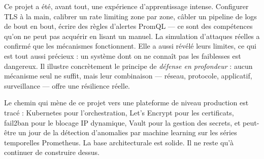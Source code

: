 \documentclass[12pt, a4paper]{report}
\begin{document}
Ce projet a été, avant tout, une expérience d'apprentissage intense. Configurer TLS à la main, calibrer un rate limiting zone par zone, câbler un pipeline de logs de bout en bout, écrire des règles d'alertes PromQL — ce sont des compétences qu'on ne peut pas acquérir en lisant un manuel. La simulation d'attaques réelles a confirmé que les mécanismes fonctionnent. Elle a aussi révélé leurs limites, ce qui est tout aussi précieux : un système dont on ne connaît pas les faiblesses est dangereux. Il illustre concrètement le principe de \textit{défense en profondeur} : aucun mécanisme seul ne suffit, mais leur combinaison — réseau, protocole, applicatif, surveillance — offre une résilience réelle.

Le chemin qui mène de ce projet vers une plateforme de niveau production est tracé : Kubernetes pour l'orchestration, Let's Encrypt pour les certificats, fail2ban pour le blocage IP dynamique, Vault pour la gestion des secrets, et peut-être un jour de la détection d'anomalies par machine learning sur les séries temporelles Prometheus. La base architecturale est solide. Il ne reste qu'à continuer de construire dessus.
\end{document}
